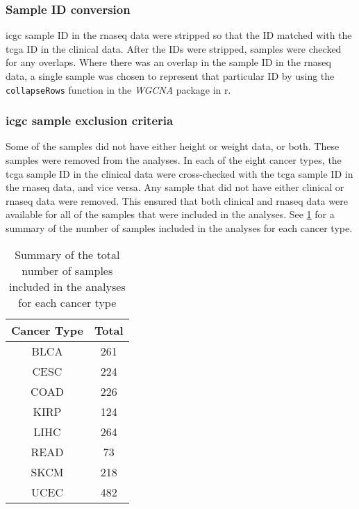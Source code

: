 \subsubsection{\textbf{Sample ID conversion}}
\gls{icgc} sample ID in the \gls{rnaseq} data were stripped so that the ID matched with the \gls{tcga} ID in the clinical data.
After the IDs were stripped, samples were checked for any overlaps.
Where there was an overlap in the sample ID in the \gls{rnaseq} data, a single sample was chosen to represent that particular ID by using the \texttt{collapseRows} function in the \textit{WGCNA} package in \gls{r}.

\subsubsection{\textbf{\gls{icgc} sample exclusion criteria}}
\label{subsec:icgcsampleexclusion}


Some of the samples did not have either height or weight data, or both.
These samples were removed from the analyses.
In each of the eight cancer types, the \gls{tcga} sample ID in the clinical data were cross-checked with the \gls{tcga} sample ID in the \gls{rnaseq} data, and vice versa.
Any sample that did not have either clinical or \gls{rnaseq} data were removed.
This ensured that both clinical and \gls{rnaseq} data were available for all of the samples that were included in the analyses.
See \cref{tab:samplesize} for a summary of the number of samples included in the analyses for each cancer type.

\begin{table}[h]
	\caption{Summary of the total number of samples included in the analyses for each cancer type}
	\label{tab:samplesize}
	\begin{center}
		\begin{tabular}{cc}
			\textbf{Cancer Type}   & \textbf{Total} \\
			\hline
			\rule{0pt}{2.25ex}BLCA & 261   \\
			CESC                   & 224   \\
			COAD                   & 226   \\
			KIRP                   & 124   \\
			LIHC                   & 264   \\
			READ                   & 73    \\
			SKCM                   & 218   \\
			UCEC                   & 482   \\
		\end{tabular}
	\end{center}
\end{table}

